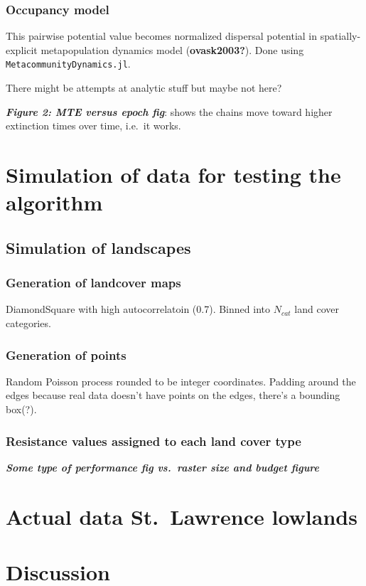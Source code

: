 \documentclass[11pt]{article}
\begin{document}
\hypertarget{occupancy-model}{%
\subsubsection{Occupancy model}\label{occupancy-model}}

This pairwise potential value becomes normalized dispersal potential in
spatially-explicit metapopulation dynamics model (\textbf{ovask2003?}).
Done using \texttt{MetacommunityDynamics.jl}.

There might be attempts at analytic stuff but maybe not here?

\textbf{\emph{Figure 2: MTE versus epoch fig}}: shows the chains move
toward higher extinction times over time, i.e.~it works.

\hypertarget{simulation-of-data-for-testing-the-algorithm}{%
\section{Simulation of data for testing the
algorithm}\label{simulation-of-data-for-testing-the-algorithm}}

\hypertarget{simulation-of-landscapes}{%
\subsection{Simulation of landscapes}\label{simulation-of-landscapes}}

\hypertarget{generation-of-landcover-maps}{%
\subsubsection{Generation of landcover
maps}\label{generation-of-landcover-maps}}

DiamondSquare with high autocorrelatoin (0.7). Binned into \(N_{cat}\)
land cover categories.

\hypertarget{generation-of-points}{%
\subsubsection{Generation of points}\label{generation-of-points}}

Random Poisson process rounded to be integer coordinates. Padding around
the edges because real data doesn't have points on the edges, there's a
bounding box(?).

\hypertarget{resistance-values-assigned-to-each-land-cover-type}{%
\subsubsection{Resistance values assigned to each land cover
type}\label{resistance-values-assigned-to-each-land-cover-type}}

\textbf{\emph{Some type of performance fig vs.~raster size and budget
figure}}

\hypertarget{actual-data-st.-lawrence-lowlands}{%
\section{Actual data St.~Lawrence
lowlands}\label{actual-data-st.-lawrence-lowlands}}

\hypertarget{discussion}{%
\section{Discussion}\label{discussion}}
\end{document}
